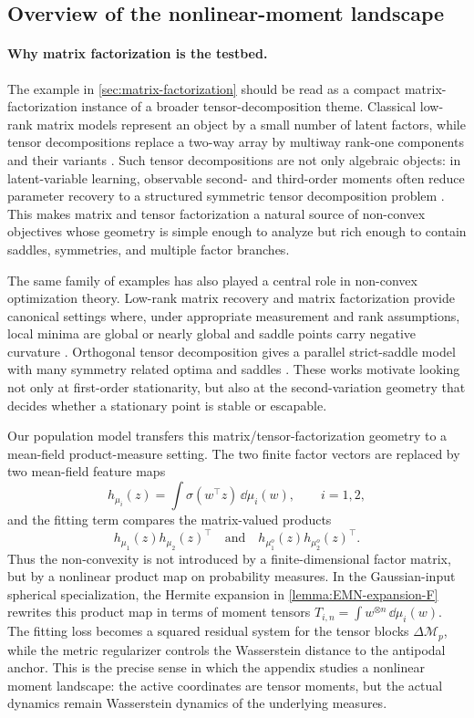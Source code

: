 
\subsection{Overview of the nonlinear-moment landscape}
\label{subsec:nonlinear-landscape-overview}

\paragraph{Why matrix factorization is the testbed.}
The example in \cref{sec:matrix-factorization} should be read as a compact
matrix-factorization instance of a broader tensor-decomposition theme.  Classical
low-rank matrix models represent an object by a small number of latent factors,
while tensor decompositions replace a two-way array by multiway rank-one
components and their variants
\citep{kolda2009tensor,sidiropoulos2017tensor}.  Such tensor decompositions are not
only algebraic objects: in latent-variable learning, observable second- and
third-order moments often reduce parameter recovery to a structured symmetric
tensor decomposition problem
\citep{anandkumar2014tensor}.  This makes matrix and tensor
factorization a natural source of non-convex objectives whose geometry is simple
enough to analyze but rich enough to contain saddles, symmetries, and multiple
factor branches.

The same family of examples has also played a central role in non-convex
optimization theory.  Low-rank matrix recovery and matrix factorization provide
canonical settings where, under appropriate measurement and rank assumptions,
local minima are global or nearly global and saddle points carry negative
curvature
\citep{BhojanapalliNeyshaburSrebro2016,GeJinZheng2017}.  Orthogonal
tensor decomposition gives a parallel strict-saddle model with many symmetry
related optima and saddles
\citep{GeHuangJinYuan2015}.  These works motivate looking not only at first-order
stationarity, but also at the second-variation geometry that decides whether a
stationary point is stable or escapable.

Our population model transfers this matrix/tensor-factorization geometry to a
mean-field product-measure setting.  The two finite factor vectors are replaced
by two mean-field feature maps
\[
    h_{\mu_i}(z)
    =
    \int \sigma(w^\top z)\,\dd\mu_i(w),
    \qquad i=1,2,
\]
and the fitting term compares the matrix-valued products
\[
    h_{\mu_1}(z)h_{\mu_2}(z)^\top
    \quad\text{and}\quad
    h_{\mu^o_1}(z)h_{\mu^o_2}(z)^\top .
\]
Thus the non-convexity is not introduced by a finite-dimensional factor matrix,
but by a nonlinear product map on probability measures.  In the Gaussian-input
spherical specialization, the Hermite expansion in
\cref{lemma:EMN-expansion-F} rewrites this product map in terms of moment tensors
\(T_{i,n}=\int w^{\otimes n}\,\dd\mu_i(w)\).  The fitting loss becomes a squared
residual system for the tensor blocks \(\Delta\mathcal M_p\), while the metric
regularizer controls the Wasserstein distance to the antipodal anchor.  This is
the precise sense in which the appendix studies a nonlinear moment landscape:
the active coordinates are tensor moments, but the actual dynamics remain
Wasserstein dynamics of the underlying measures.

